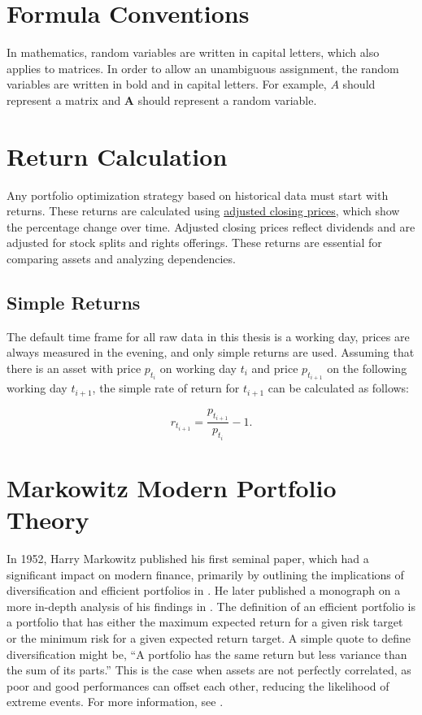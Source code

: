 \documentclass[
  oneside, a4paper, 12pt, openany]{book}
\theoremstyle{definition}
\theoremstyle{definition}
\theoremstyle{definition}
\theoremstyle{definition}
\theoremstyle{remark}
\begin{document}
\hypertarget{formula-conventions}{%
\section{Formula Conventions}\label{formula-conventions}}

In mathematics, random variables are written in capital letters, which also applies to matrices. In order to allow an unambiguous assignment, the random variables are written in bold and in capital letters. For example, \(A\) should represent a matrix and \(\pmb{A}\) should represent a random variable.

\hypertarget{return-calculation}{%
\section{Return Calculation}\label{return-calculation}}

Any portfolio optimization strategy based on historical data must start with returns. These returns are calculated using \href{https://www.investopedia.com/terms/a/adjusted\%20closingprice.asp}{adjusted closing prices}, which show the percentage change over time. Adjusted closing prices reflect dividends and are adjusted for stock splits and rights offerings. These returns are essential for comparing assets and analyzing dependencies.

\hypertarget{simple-returns}{%
\subsection{Simple Returns}\label{simple-returns}}

The default time frame for all raw data in this thesis is a working day, prices are always measured in the evening, and only simple returns are used. Assuming that there is an asset with price \(p_{t_i}\) on working day \(t_i\) and price \(p_{t_{i+1}}\) on the following working day \(t_{i+1}\), the simple rate of return for \(t_{i+1}\) can be calculated as follows:

\[
  r_{t_{i+1}} = \frac{p_{t_{i+1}}}{p_{t_i}}-1.
\]

\hypertarget{markowitz-modern-portfolio-theory}{%
\section{Markowitz Modern Portfolio Theory}\label{markowitz-modern-portfolio-theory}}

In 1952, Harry Markowitz published his first seminal paper, which had a significant impact on modern finance, primarily by outlining the implications of diversification and efficient portfolios in \citep{Mark1952}. He later published a monograph on a more in-depth analysis of his findings in \citep{Mark1959}. The definition of an efficient portfolio is a portfolio that has either the maximum expected return for a given risk target or the minimum risk for a given expected return target. A simple quote to define diversification might be, ``A portfolio has the same return but less variance than the sum of its parts.'' This is the case when assets are not perfectly correlated, as poor and good performances can offset each other, reducing the likelihood of extreme events. For more information, see \citep{Mari2005}.
\end{document}

